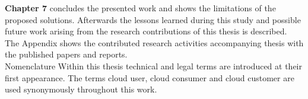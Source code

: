 \textbf{Chapter 7} concludes the presented work and shows the  limitations of the proposed solutions. Afterwards the lessons learned during this study and possible future work arising from the research contributions of this thesis is described.\\

The Appendix shows the contributed research activities accompanying thesis with the published papers and reports. \\

Nomenclature
Within this thesis technical and legal terms are introduced at their first appearance. 
The terms cloud user, cloud consumer and cloud customer are used synonymously throughout this work.
